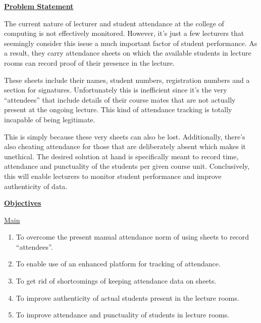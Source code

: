 \documentclass[]{report}
\title{}
\author{KAHIGIRIZA PETER WARREN		216002577		16/U/5173/PS\\
	AINEBYONA DONALD			216013093		16/U/2970/PS\\
	KYOBWEINE PRISCA			216002579		16/U/6489/PS\\
	KIZITO EZEKIEL				213012200		13/U/6970/EVE}
\begin{document}
\maketitle 

\begin{flushleft}
	\underline{\textbf{Problem Statement}}\linebreak
	
	The current nature of lecturer and student attendance at the college of computing is not effectively monitored. However, it’s just a few lecturers that seemingly consider this issue a much important factor of student performance. As a result, they carry attendance sheets on which the available students in lecture rooms can record proof of their presence in the lecture.\linebreak
	
	 These sheets include their names, student numbers, registration numbers and a section for signatures. Unfortunately this is inefficient since it’s the very “attendees” that include details of their course mates that are not actually present at the ongoing lecture. This kind of attendance tracking is totally incapable of being legitimate.\linebreak
	 
	  This is simply because these very sheets can also be lost. Additionally, there’s also cheating attendance for those that are deliberately absent which makes it unethical. The desired solution at hand is specifically meant to record time, attendance and punctuality of the students per given course unit. Conclusively, this will enable lecturers to monitor student performance and improve authenticity of data.\linebreak
	  
	  
	\underline{\textbf{Objectives}}\linebreak
	
	\underline{Main}
	\begin{enumerate}
		\item To overcome the present manual attendance norm of using sheets to record “attendees”.
		\item To enable use of an enhanced platform for tracking of attendance.
	\item	To get rid of shortcomings of keeping attendance data on sheets.
	\item	To improve authenticity of actual students present in the lecture rooms.
		\item To improve attendance and punctuality of students in lecture rooms.
		

\end{enumerate}
\end{flushleft}
\end{document}
